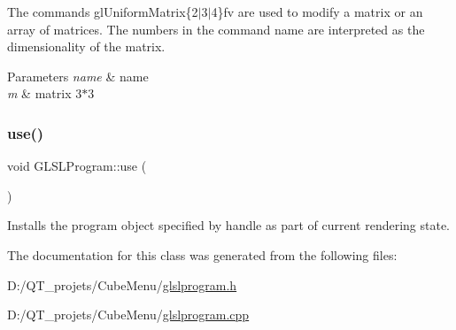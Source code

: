 The commands gl\+Uniform\+Matrix\{2$\vert$3$\vert$4\}fv are used to modify a matrix or an array of matrices. The numbers in the command name are interpreted as the dimensionality of the matrix. 


\begin{DoxyParams}{Parameters}
{\em name} & name \\
\hline
{\em m} & matrix 3$\ast$3 \\
\hline
\end{DoxyParams}
\hypertarget{class_g_l_s_l_program_a0ea2aeacb4361b37f145246430134bb6}{}\label{class_g_l_s_l_program_a0ea2aeacb4361b37f145246430134bb6} 
\subsubsection{\texorpdfstring{use()}{use()}}
{\footnotesize\ttfamily void G\+L\+S\+L\+Program\+::use (\begin{DoxyParamCaption}{ }\end{DoxyParamCaption})}

Installs the program object specified by handle as part of current rendering state. 

The documentation for this class was generated from the following files\+:\begin{DoxyCompactItemize}
\item 
D\+:/\+Q\+T\+\_\+projets/\+Cube\+Menu/\hyperlink{glslprogram_8h}{glslprogram.\+h}\item 
D\+:/\+Q\+T\+\_\+projets/\+Cube\+Menu/\hyperlink{glslprogram_8cpp}{glslprogram.\+cpp}\end{DoxyCompactItemize}
